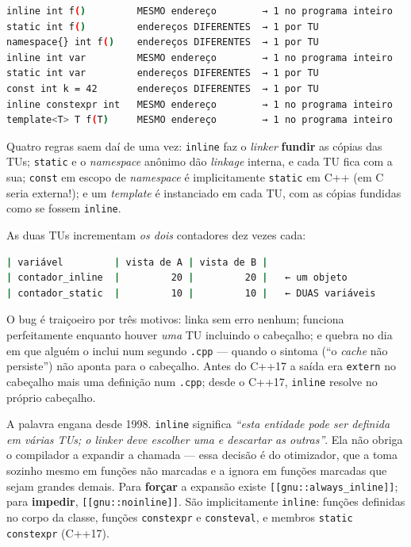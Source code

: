 \begin{lstlisting}[style=bt, language=bash,
    caption={Saída de \texttt{src/linkage/}: os endereços vêm do \emph{linker},
             não de simulação.}]
inline int f()         MESMO endereço        → 1 no programa inteiro
static int f()         endereços DIFERENTES  → 1 por TU
namespace{} int f()    endereços DIFERENTES  → 1 por TU
inline int var         MESMO endereço        → 1 no programa inteiro
static int var         endereços DIFERENTES  → 1 por TU
const int k = 42       endereços DIFERENTES  → 1 por TU
inline constexpr int   MESMO endereço        → 1 no programa inteiro
template<T> T f(T)     MESMO endereço        → 1 no programa inteiro
\end{lstlisting}

Quatro regras saem daí de uma vez: \texttt{inline} faz o \emph{linker}
\textbf{fundir} as cópias das TUs; \texttt{static} e o \emph{namespace} anônimo
dão \emph{linkage} interna, e cada TU fica com a sua; \texttt{const} em escopo de
\emph{namespace} é implicitamente \texttt{static} em C++ (em C seria externa!);
e um \emph{template} é instanciado em cada TU, com as cópias fundidas como se
fossem \texttt{inline}.

\begin{armadilha}
As duas TUs incrementam \emph{os dois} contadores dez vezes cada:
\begin{lstlisting}[style=bt, language=bash, frame=none,
                   xleftmargin=0pt, xrightmargin=0pt]
| variável         | vista de A | vista de B |
| contador_inline  |         20 |         20 |   ← um objeto
| contador_static  |         10 |         10 |   ← DUAS variáveis
\end{lstlisting}
O bug é traiçoeiro por três motivos: linka sem erro nenhum; funciona
perfeitamente enquanto houver \emph{uma} TU incluindo o cabeçalho; e quebra no
dia em que alguém o inclui num segundo \texttt{.cpp} --- quando o sintoma (``o
\emph{cache} não persiste'') não aponta para o cabeçalho. Antes do C++17 a saída
era \texttt{extern} no cabeçalho mais uma definição num \texttt{.cpp}; desde o
C++17, \texttt{inline} resolve no próprio cabeçalho.
\end{armadilha}

\begin{porque}
A palavra engana desde 1998. \texttt{inline} significa \emph{``esta entidade pode
ser definida em várias TUs; o \emph{linker} deve escolher uma e descartar as
outras''}. Ela não obriga o compilador a expandir a chamada --- essa decisão é
do otimizador, que a toma sozinho mesmo em funções não marcadas e a ignora em
funções marcadas que sejam grandes demais. Para \textbf{forçar} a expansão
existe \texttt{[[gnu::always\_inline]]}; para \textbf{impedir},
\texttt{[[gnu::noinline]]}. São implicitamente \texttt{inline}: funções
definidas no corpo da classe, funções \texttt{constexpr} e \texttt{consteval}, e
membros \texttt{static constexpr} (C++17).
\end{porque}

